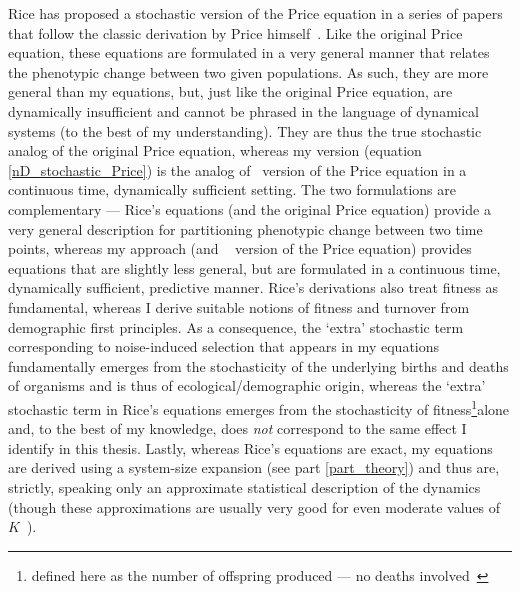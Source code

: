 Rice has proposed a stochastic version of the Price equation in a series of papers~\citep{rice_stochastic_2008,rice_evolution_2009,rice_universal_2020} that follow the classic derivation by Price himself~\citep{rice_evolutionary_2004}. Like the original Price equation, these equations are formulated in a very general manner that relates the phenotypic change between two given populations. As such, they are more general than my equations, but, just like the original Price equation, are dynamically insufficient and cannot be phrased in the language of dynamical systems (to the best of my understanding). They are thus the true stochastic analog of the original Price equation, whereas my version (equation \eqref{nD_stochastic_Price}) is the analog of~ version of the Price equation in a continuous time, dynamically sufficient setting. The two formulations are complementary --- Rice's equations (and the original Price equation) provide a very general description for partitioning phenotypic change between two time points, whereas my approach (and ~ version of the Price equation) provides equations that are slightly less general, but are formulated in a continuous time, dynamically sufficient, predictive manner. Rice's derivations also treat fitness as fundamental, whereas I derive suitable notions of fitness and turnover from demographic first principles. As a consequence, the `extra' stochastic term corresponding to noise-induced selection that appears in my equations fundamentally emerges from the stochasticity of the underlying births and deaths of organisms and is thus of ecological/demographic origin, whereas the `extra' stochastic term in Rice's equations emerges from the stochasticity of fitness\footnote{defined here as the number of offspring produced --- no deaths involved~\citep{rice_stochastic_2008,rice_evolution_2009,rice_universal_2020}}alone and, to the best of my knowledge, does \emph{not} correspond to the same effect I identify in this thesis. Lastly, whereas Rice's equations are exact, my equations are derived using a system-size expansion (see part \ref{part_theory}) and thus are, strictly, speaking only an approximate statistical description of the dynamics (though these approximations are usually very good for even moderate values of $K$~\citep{black_stochastic_2012,cianci_wkb_2015}).

